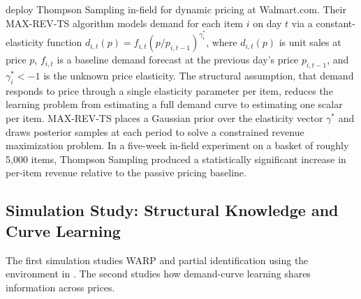 \citet{Ganti2018} deploy Thompson Sampling in-field for dynamic pricing at Walmart.com. Their MAX-REV-TS algorithm models demand for each item $i$ on day $t$ via a constant-elasticity function $d_{i,t}(p) = f_{i,t}(p/p_{i,t-1})^{\gamma_i^*}$, where $d_{i,t}(p)$ is unit sales at price $p$, $f_{i,t}$ is a baseline demand forecast at the previous day's price $p_{i,t-1}$, and $\gamma_i^* < -1$ is the unknown price elasticity. The structural assumption, that demand responds to price through a single elasticity parameter per item, reduces the learning problem from estimating a full demand curve to estimating one scalar per item. MAX-REV-TS places a Gaussian prior over the elasticity vector $\gamma^*$ and draws posterior samples at each period to solve a constrained revenue maximization problem. In a five-week in-field experiment on a basket of roughly 5,000 items, Thompson Sampling produced a statistically significant increase in per-item revenue relative to the passive pricing baseline.

\subsection{Simulation Study: Structural Knowledge and Curve Learning}
\label{sec:bandit_sim}

The first simulation studies WARP and partial identification using the environment in \citet{Misra2019}. The second studies how demand-curve learning shares information across prices.

